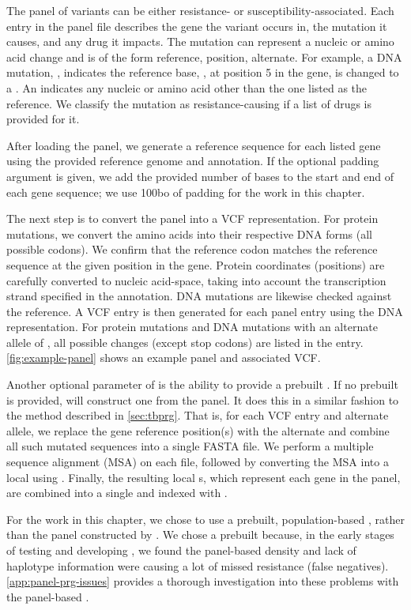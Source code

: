 The panel of variants can be either resistance- or susceptibility-associated. Each entry in the panel file describes the gene the variant occurs in, the mutation it causes, and any drug it impacts. The mutation can represent a nucleic or amino acid change and is of the form reference, position, alternate. For example, a DNA mutation, , indicates the reference base, , at position 5 in the gene, is changed to a . An  indicates any nucleic or amino acid other than the one listed as the reference. We classify the mutation as resistance-causing if a list of drugs is provided for it.

After loading the panel, we generate a reference sequence for each listed gene using the provided reference genome and annotation. If the optional padding argument is given, we add the provided number of bases to the start and end of each gene sequence; we use 100bo of padding for the work in this chapter.

The next step is to convert the panel into a VCF representation. For protein mutations, we convert the amino acids into their respective DNA forms (all possible codons). We confirm that the reference codon matches the reference sequence at the given position in the gene. Protein coordinates (positions) are carefully converted to nucleic acid-space, taking into account the transcription strand specified in the annotation. DNA mutations are likewise checked against the reference. A VCF entry is then generated for each panel entry using the DNA representation. For protein mutations and DNA mutations with an alternate allele of , all possible changes (except stop codons) are listed in the entry. \autoref{fig:example-panel} shows an example panel and associated VCF.

Another optional parameter of \drprg{}  is the ability to provide a prebuilt \prg{}. If no prebuilt \prg{} is provided, \drprg{} will construct one from the panel. It does this in a similar fashion to the method described in \autoref{sec:tbprg}. That is, for each VCF entry and alternate allele, we replace the gene reference position(s) with the alternate and combine all such mutated sequences into a single FASTA file. We perform a multiple sequence alignment (MSA) on each file, followed by converting the MSA into a local \prg{} using \makeprg{}. Finally, the resulting local \prg{}s, which represent each gene in the panel, are combined into a single \prg{} and indexed with \pandora{}.

For the work in this chapter, we chose to use a prebuilt, population-based \prg{}, rather than the panel \prg{} constructed by \drprg{}. We chose a prebuilt \prg{} because, in the early stages of testing and developing \drprg{}, we found the panel-based \prg{} density and lack of haplotype information were causing a lot of missed resistance (false negatives). \autoref{app:panel-prg-issues} provides a thorough investigation into these problems with the panel-based \prg{}.

